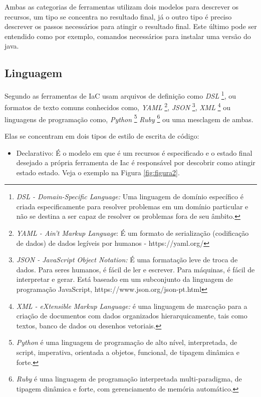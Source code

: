 Ambas as categorias de ferramentas utilizam dois modelos para descrever os recursos, um tipo se concentra no resultado final, já o outro tipo é preciso descrever os passos necessários para atingir o resultado final. Este último pode ser entendido como por exemplo, comandos necessários para instalar uma versão do java.

\subsection{Linguagem}

Segundo  as ferramentas de IaC usam arquivos de definição como \textit{DSL} \footnote{\textit{DSL - Domain-Specific Language:} Uma linguagem de domínio específico é criada especificamente para resolver problemas em um domínio particular e não se destina a ser capaz de resolver os problemas fora de seu âmbito. }, ou formatos de texto comuns conhecidos como, \textit{ YAML} \footnote{\textit{YAML - Ain't  Markup Language}: É um formato de serialização (codificação de dados) de dados legíveis por humanos -  https://yaml.org/ }, \textit{JSON} \footnote{\textit{JSON - JavaScript Object Notation:} É uma formatação leve de troca de dados. Para seres humanos, é fácil de ler e escrever. Para máquinas, é fácil de interpretar e gerar. Está baseado em um subconjunto da linguagem de programação JavaScript, https://www.json.org/json-pt.html}, \textit{XML} \footnote{\textit{XML - eXtensible Markup Language:} é uma linguagem de marcação para a criação de documentos com dados organizados hierarquicamente, tais como textos, banco de dados ou desenhos vetoriais.}
  ou linguagens de programação como, \textit{Python} \footnote{\textit{Python} é uma linguagem de programação de alto nível, interpretada, de script, imperativa, orientada a objetos, funcional, de tipagem dinâmica e forte.}  \textit{Ruby} \footnote{\textit{Ruby} é uma linguagem de programação interpretada multi-paradigma, de tipagem dinâmica e forte, com gerenciamento de memória automático.}  ou uma mesclagem de ambas.
  
  Elas se concentram em dois tipos de estilo de escrita de código: 
   \begin{itemize}
       \item Declarativo: É o modelo em que é um recursos é especificado e o estado final desejado a própria ferramenta de Iac é responsável por descobrir como atingir estado estado. Veja o exemplo na Figura \ref{fig:figura2}.
   \end{itemize}

